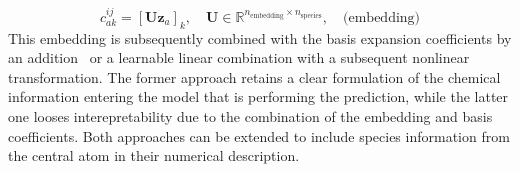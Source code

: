 \begin{equation}
  \label{eq:chemical_embedding}
  c^{ij}_{ak} = [\mathbf{U}\mathbf{z}_a]_k, \quad \mathbf{U}\in\mathbb{R}^{n_\text{embedding}\times n_\text{species}}, \quad \text{(embedding)}
\end{equation}
This embedding is subsequently combined with the basis expansion coefficients %
by an addition~\cite{schutt2018schnet} or a learnable linear combination with a subsequent nonlinear transformation.
The former approach retains a clear formulation of the chemical information entering the model that is performing the prediction, while the latter one looses interepretability due to the combination of the embedding and basis coefficients.
Both approaches can be extended to include species information from the central atom in their numerical description.






